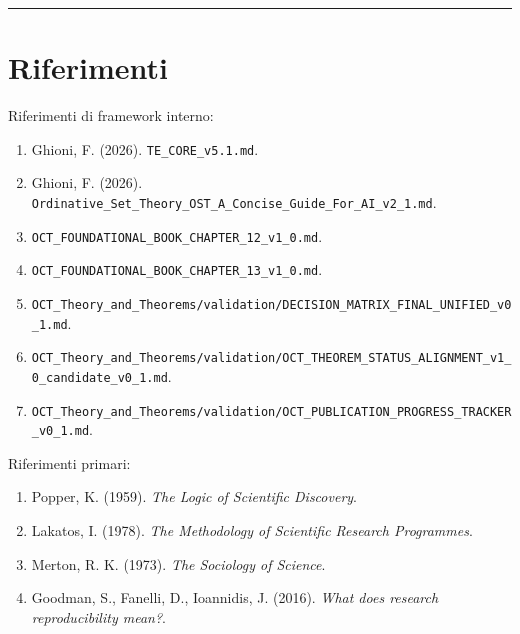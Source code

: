 \begin{center}\rule{0.5\linewidth}{0.5pt}\end{center}

\section{Riferimenti}

Riferimenti di framework interno:

\begin{enumerate}
\def\labelenumi{\arabic{enumi}.}
\tightlist
\item
  Ghioni, F. (2026). \texttt{TE\_CORE\_v5.1.md}.
\item
  Ghioni, F. (2026). \texttt{Ordinative\_Set\_Theory\_OST\_A\_Concise\_Guide\_For\_AI\_v2\_1.md}.
\item
  \texttt{OCT\_FOUNDATIONAL\_BOOK\_CHAPTER\_12\_v1\_0.md}.
\item
  \texttt{OCT\_FOUNDATIONAL\_BOOK\_CHAPTER\_13\_v1\_0.md}.
\item
  \texttt{OCT\_Theory\_and\_Theorems/validation/DECISION\_MATRIX\_FINAL\_UNIFIED\_v0\_1.md}.
\item
  \texttt{OCT\_Theory\_and\_Theorems/validation/OCT\_THEOREM\_STATUS\_ALIGNMENT\_v1\_0\_candidate\_v0\_1.md}.
\item
  \texttt{OCT\_Theory\_and\_Theorems/validation/OCT\_PUBLICATION\_PROGRESS\_TRACKER\_v0\_1.md}.
\end{enumerate}

Riferimenti primari:

\begin{enumerate}
\def\labelenumi{\arabic{enumi}.}
\tightlist
\item
  Popper, K. (1959). \emph{The Logic of Scientific Discovery}.
\item
  Lakatos, I. (1978). \emph{The Methodology of Scientific Research Programmes}.
\item
  Merton, R. K. (1973). \emph{The Sociology of Science}.
\item
  Goodman, S., Fanelli, D., Ioannidis, J. (2016). \emph{What does research reproducibility mean?}.
\end{enumerate}
